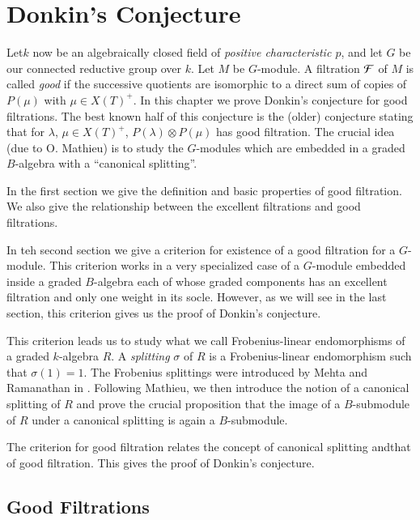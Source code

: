 \chapter{Donkin's Conjecture}\label{chap4}

Let\pageoriginale $k$\label{page33} now be an algebraically closed field of {\em
  positive characteristic $p$}, and let $G$ be our connected reductive
group over $k$. Let $M$ be $G$-module. A filtration $\mathcal{F}$ of $M$ is
called {\em good} if the successive quotients are isomorphic to a
direct sum of copies of $P(\mu)$ with $\mu\in X(T)^{+}$. In this
chapter we prove Donkin's conjecture for good filtrations. The best
known half of this conjecture is the (older) conjecture stating that
for $\lambda$, $\mu\in X(T)^{+}$, $P(\lambda)\otimes P(\mu)$ has good
filtration. The crucial idea (due to O. Mathieu) is to study the
$G$-modules which are embedded in a graded $B$-algebra with a
``canonical splitting''.

In the first section we give the definition and basic properties of
good filtration. We also give the relationship between the excellent
filtrations and good filtrations.

In teh second section we give a criterion for existence of a good
filtration for a $G$-module. This criterion works in a very
specialized case of a $G$-module embedded inside a graded $B$-algebra
each of whose graded components has an excellent filtration and only
one weight in its socle. However, as we will see in the last section,
this criterion gives us the proof of Donkin's conjecture.

This criterion leads us to study what we call Frobenius-linear
endomorphisms of a graded $k$-algebra $R$. A {\em splitting} $\sigma$
of $R$ is a Frobenius-linear endomorphism such that $\sigma(1)=1$. The
Frobenius splittings were introduced by Mehta and Ramanathan in
\cite{key24}. Following Mathieu, we then introduce the notion of a
canonical splitting of $R$ and prove the crucial proposition that the
image of a $B$-submodule of $R$ under a canonical splitting is again a
$B$-submodule. 

The criterion for good filtration relates the concept of canonical
splitting and\pageoriginale that\label{page34} of good filtration. This gives the
proof of Donkin's conjecture.

\section{Good Filtrations}\label{chap4-sec4.1}

